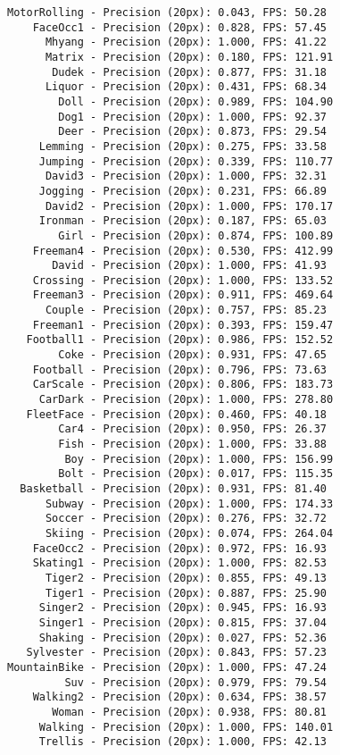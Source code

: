 \begin{lstlisting}
MotorRolling - Precision (20px): 0.043, FPS: 50.28
    FaceOcc1 - Precision (20px): 0.828, FPS: 57.45
      Mhyang - Precision (20px): 1.000, FPS: 41.22
      Matrix - Precision (20px): 0.180, FPS: 121.91
       Dudek - Precision (20px): 0.877, FPS: 31.18
      Liquor - Precision (20px): 0.431, FPS: 68.34
        Doll - Precision (20px): 0.989, FPS: 104.90
        Dog1 - Precision (20px): 1.000, FPS: 92.37
        Deer - Precision (20px): 0.873, FPS: 29.54
     Lemming - Precision (20px): 0.275, FPS: 33.58
     Jumping - Precision (20px): 0.339, FPS: 110.77
      David3 - Precision (20px): 1.000, FPS: 32.31
     Jogging - Precision (20px): 0.231, FPS: 66.89
      David2 - Precision (20px): 1.000, FPS: 170.17
     Ironman - Precision (20px): 0.187, FPS: 65.03
        Girl - Precision (20px): 0.874, FPS: 100.89
    Freeman4 - Precision (20px): 0.530, FPS: 412.99
       David - Precision (20px): 1.000, FPS: 41.93
    Crossing - Precision (20px): 1.000, FPS: 133.52
    Freeman3 - Precision (20px): 0.911, FPS: 469.64
      Couple - Precision (20px): 0.757, FPS: 85.23
    Freeman1 - Precision (20px): 0.393, FPS: 159.47
   Football1 - Precision (20px): 0.986, FPS: 152.52
        Coke - Precision (20px): 0.931, FPS: 47.65
    Football - Precision (20px): 0.796, FPS: 73.63
    CarScale - Precision (20px): 0.806, FPS: 183.73
     CarDark - Precision (20px): 1.000, FPS: 278.80
   FleetFace - Precision (20px): 0.460, FPS: 40.18
        Car4 - Precision (20px): 0.950, FPS: 26.37
        Fish - Precision (20px): 1.000, FPS: 33.88
         Boy - Precision (20px): 1.000, FPS: 156.99
        Bolt - Precision (20px): 0.017, FPS: 115.35
  Basketball - Precision (20px): 0.931, FPS: 81.40
      Subway - Precision (20px): 1.000, FPS: 174.33
      Soccer - Precision (20px): 0.276, FPS: 32.72
      Skiing - Precision (20px): 0.074, FPS: 264.04
    FaceOcc2 - Precision (20px): 0.972, FPS: 16.93
    Skating1 - Precision (20px): 1.000, FPS: 82.53
      Tiger2 - Precision (20px): 0.855, FPS: 49.13
      Tiger1 - Precision (20px): 0.887, FPS: 25.90
     Singer2 - Precision (20px): 0.945, FPS: 16.93
     Singer1 - Precision (20px): 0.815, FPS: 37.04
     Shaking - Precision (20px): 0.027, FPS: 52.36
   Sylvester - Precision (20px): 0.843, FPS: 57.23
MountainBike - Precision (20px): 1.000, FPS: 47.24
         Suv - Precision (20px): 0.979, FPS: 79.54
    Walking2 - Precision (20px): 0.634, FPS: 38.57
       Woman - Precision (20px): 0.938, FPS: 80.81
     Walking - Precision (20px): 1.000, FPS: 140.01
     Trellis - Precision (20px): 1.000, FPS: 42.13


\end{lstlisting}
